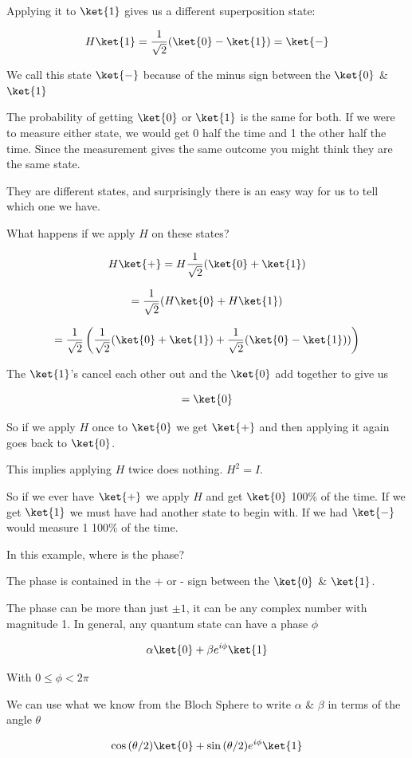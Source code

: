 \documentclass{book}
\begin{document}
Applying it to $\ket{1}$ gives us a different superposition state: 

$$
H\ket{1} = \frac{1}{\sqrt{2}} ( \ket{0} - \ket{1}) = \ket{-}
$$

We call this state $\ket{-}$ because of the minus sign between the $\ket{0}$ \& $\ket{1}$

The probability of getting $\ket{0}$ or $\ket{1}$ is the same for both. If we were to measure either state, we would get 0 half the time and 1 the other half the time. Since the measurement gives the same outcome you might think they are the same state. 
 
They are different states, and surprisingly there is an easy way for us to tell which one we have. 

What happens if we apply $H$ on these states? 

$$ H\ket{+} = H \frac{1}{\sqrt{2}} ( \ket{0} + \ket{1})$$

$$= \frac{1}{\sqrt{2}} (H\ket{0} + H\ket{1})$$

$$ = \frac{1}{\sqrt{2}}\left( \frac{1}{\sqrt{2}}(\ket{0} + \ket{1})+\frac{1}{\sqrt{2}}(\ket{0} - \ket{1}))  \right)$$

The $\ket{1}$'s cancel each other out and the $\ket{0}$ add together to give us

$$ = \ket{0} $$

So if we apply $H$ once to $\ket{0}$ we get $\ket{+}$ and then applying it again goes back to $\ket{0}$. 

This implies applying $H$ twice does nothing. $H^2 = I$.

So if we ever have $\ket{+}$ we apply $H$ and get $\ket{0}$ 100\% of the time. If we get $\ket{1}$ we must have had another state to begin with. If we had $\ket{-}$ would measure 1 100\% of the time. 

In this example, where is the phase? 

The phase is contained in the + or - sign between the $\ket{0}$ \& $\ket{1}$. 

The phase can be more than just $\pm 1$, it can be any complex number with magnitude 1. In general, any quantum state can have a phase $\phi$ 

$$ \alpha\ket{0} + \beta e^{i\phi}\ket{1} $$

With $ 0 \leq \phi < 2\pi $

We can use what we know from the Bloch Sphere to write $\alpha$ \& $\beta$ in terms of the angle $\theta$

$$ \cos{(\theta/2)}\ket{0} + \sin{(\theta/2)} e^{i\phi}\ket{1} $$
\end{document}
